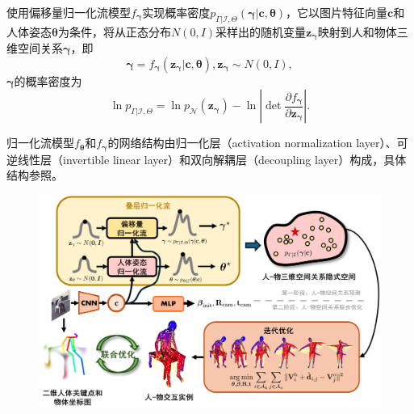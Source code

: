 使用偏移量归一化流模型$f_{\mathbf{\gamma}}$实现概率密度$p_{\Gamma|\mathcal{I},\Theta}(\mathbf{\gamma}|\mathbf{c},\mathbf{\theta})$，它以图片特征向量$\mathbf{c}$和人体姿态$\mathbf{\theta}$为条件，将从正态分布$N(0,I)$采样出的随机变量$\mathbf{z}_{\mathbf{\gamma}}$映射到人和物体三维空间关系$\mathbf{\gamma}$，即
\begin{equation}
	\mathbf{\gamma} = f_{\mathbf{\gamma}}(\mathbf{z}_{\mathbf{\gamma}}|\mathbf{c},\mathbf{\theta}), \mathbf{z}_{\mathbf{\gamma}} \sim N(0,I),
\end{equation}
$\mathbf{\gamma}$的概率密度为
\begin{equation}
	\ln p_{\Gamma|\mathcal{I},\Theta} = \ln p_{\mathcal{N}}(\mathbf{z}_{\mathbf{\gamma}}) - \ln \left| \det \frac{\partial f_{\mathbf{\gamma}}}{\partial \mathbf{z}_{\mathbf{\gamma}}} \right|.
\end{equation}

归一化流模型$f_{\mathbf{\theta}}$和$f_{\mathbf{\gamma}}$的网络结构由归一化层（activation normalization layer）、可逆线性层（invertible linear layer）和双向解耦层（decoupling layer）构成，具体结构参照\citep{Glow}。

\begin{figure}[!htbp]
	\centering
	\includegraphics{Img/stackflow}
	\label{fig:stackflow}
\end{figure}

